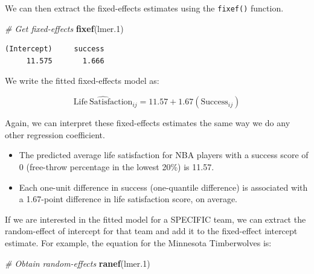 \documentclass[]{book}
\newenvironment{Shaded}{\begin{snugshade}}{\end{snugshade}}
\newcommand{\CommentTok}[1]{\textcolor[rgb]{0.56,0.35,0.01}{\textit{#1}}}
\newcommand{\FloatTok}[1]{\textcolor[rgb]{0.00,0.00,0.81}{#1}}
\newcommand{\KeywordTok}[1]{\textcolor[rgb]{0.13,0.29,0.53}{\textbf{#1}}}
\newcommand{\NormalTok}[1]{#1}
\providecommand{\tightlist}{%
  \setlength{\itemsep}{0pt}\setlength{\parskip}{0pt}}
\begin{document}
We can then extract the fixed-effects estimates using the \texttt{fixef()} function.

\begin{Shaded}
\begin{Highlighting}[]
\CommentTok{# Get fixed-effects}
\KeywordTok{fixef}\NormalTok{(lmer}\FloatTok{.1}\NormalTok{)}
\end{Highlighting}
\end{Shaded}

\begin{verbatim}
(Intercept)     success 
     11.575       1.666 
\end{verbatim}

We write the fitted fixed-effects model as:

\[
\hat{\mathrm{Life~Satisfaction}}_{ij} = 11.57 + 1.67(\mathrm{Success}_{ij})
\]

Again, we can interpret these fixed-effects estimates the same way we do any other regression coefficient.

\begin{itemize}
\tightlist
\item
  The predicted average life satisfaction for NBA players with a success score of 0 (free-throw percentage in the lowest 20\%) is 11.57.
\item
  Each one-unit difference in success (one-quantile difference) is associated with a 1.67-point difference in life satisfaction score, on average.
\end{itemize}

If we are interested in the fitted model for a SPECIFIC team, we can extract the random-effect of intercept for that team and add it to the fixed-effect intercept estimate. For example, the equation for the Minnesota Timberwolves is:

\begin{Shaded}
\begin{Highlighting}[]
\CommentTok{# Obtain random-effects}
\KeywordTok{ranef}\NormalTok{(lmer}\FloatTok{.1}\NormalTok{)}
\end{Highlighting}
\end{Shaded}
\end{document}

